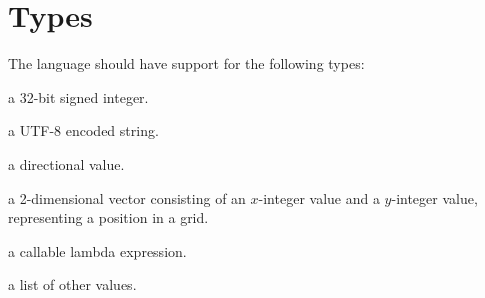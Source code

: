 \section{Types}

The language should have support for the following types:

\begin{description}[noitemsep]
\item[Integer] a 32-bit signed integer.
\item[String] a UTF-8 encoded string.
\item[Direction] a directional value.
\item[Coordinate] a 2-dimensional vector consisting of an $x$-integer value and
a $y$-integer value, representing a position in a grid.
\item[Lambda] a callable lambda expression.
\item[List] a list of other values.
\end{description}
